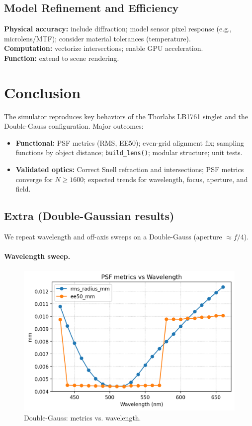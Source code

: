 \documentclass[11pt,a4paper]{article}
\begin{document}
	\subsection{Model Refinement and Efficiency}
	
	\textbf{Physical accuracy:} include diffraction; model sensor pixel response (e.g., microlens/MTF); consider material tolerances (temperature).\\
	\textbf{Computation:} vectorize intersections; enable GPU acceleration.\\
	\textbf{Function:} extend to scene rendering.
	
	\section*{Conclusion}
	
	The simulator reproduces key behaviors of the Thorlabs LB1761 singlet and the Double-Gauss configuration. Major outcomes:
	\begin{itemize}
		\item \textbf{Functional:} PSF metrics (RMS, EE50); even-grid alignment fix; sampling functions by object distance; \texttt{build\_lens()}; modular structure; unit tests.
		\item \textbf{Validated optics:} Correct Snell refraction and intersections; PSF metrics converge for \(N \ge 1600\); expected trends for wavelength, focus, aperture, and field.
	\end{itemize}
	
	\subsection*{Extra (Double-Gaussian results)}\label{extra-double-gaussian}
	
	We repeat wavelength and off-axis sweeps on a Double-Gauss (aperture \(\approx f/4\)).
	
	\paragraph{Wavelength sweep.}%
	\begin{figure}[H]
		\centering
		\includegraphics[width=\linewidth]{sweep_lambda/metrics_vs_lambda_nm.png}
		\caption{Double-Gauss: metrics vs. wavelength.}
	\end{figure}
	
\end{document}

